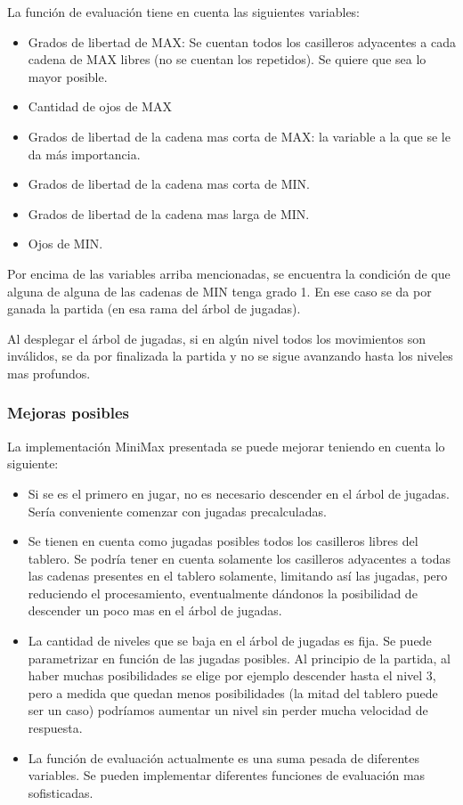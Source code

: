 \documentclass[11pt]{article}
\begin{document}
   La funci\'on de evaluaci\'on tiene en cuenta las siguientes
   variables:
   
   \begin{itemize}
      \item Grados de libertad de MAX: Se cuentan todos los casilleros
        adyacentes a cada cadena de MAX libres (no se cuentan los
        repetidos). Se quiere que sea lo mayor posible.
      \item Cantidad de ojos de MAX
      \item Grados de libertad de la cadena mas corta de MAX: la
        variable a la que se le da m\'as importancia.
      \item Grados de libertad de la cadena mas corta de MIN.
      \item Grados de libertad de la cadena mas larga de MIN.
      \item Ojos de MIN.
   \end{itemize}
   
   Por encima de las variables arriba mencionadas, se encuentra la
   condici\'on de que alguna de alguna de las cadenas de MIN tenga
   grado 1. En ese caso se da por ganada la partida (en esa rama del
   \'arbol de jugadas).

   Al desplegar el \'arbol de jugadas, si en alg\'un nivel todos los
   movimientos son inv\'alidos, se da por finalizada la partida y no
   se sigue avanzando hasta los niveles mas profundos.

\subsubsection{Mejoras posibles}

   La implementaci\'on MiniMax presentada se puede mejorar teniendo en
   cuenta lo siguiente:

   \begin{itemize}
     \item Si se es el primero en jugar, no es necesario descender en
       el \'arbol de jugadas. Ser\'ia conveniente comenzar con jugadas
       precalculadas.
     \item Se tienen en cuenta como jugadas posibles todos los
       casilleros libres del tablero. Se podr\'ia tener en cuenta
       solamente los casilleros adyacentes a todas las cadenas
       presentes en el tablero solamente, limitando as\'i las jugadas,
       pero reduciendo el procesamiento, eventualmente d\'andonos la
       posibilidad de descender un poco mas en el \'arbol de jugadas.
     \item La cantidad de niveles que se baja en el \'arbol de jugadas
       es fija. Se puede parametrizar en funci\'on de las jugadas
       posibles. Al principio de la partida, al haber muchas
       posibilidades se elige por ejemplo descender hasta el nivel 3,
       pero a medida que quedan menos posibilidades (la mitad del
       tablero puede ser un caso) podr\'iamos aumentar un nivel sin
       perder mucha velocidad de respuesta.
     \item La funci\'on de evaluaci\'on actualmente es una suma pesada
       de diferentes variables. Se pueden implementar diferentes
       funciones de evaluaci\'on mas sofisticadas.
   \end{itemize}
\end{document}
